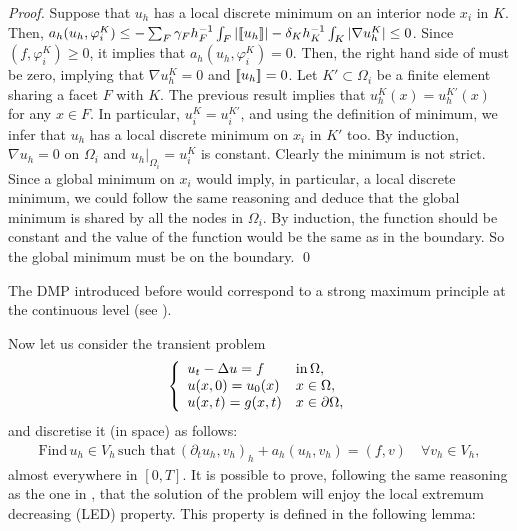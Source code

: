 \begin{proof}
Suppose that $u_h$ has a local discrete minimum on an interior node $x_i$ in $K$. Then, $a_h(u_h,\varphi_i^K) \leq -   \sum _{F}\gamma_F h_F^{-1} \int_F |\lbrack\!\lbrack u_h \rbrack\!\rbrack| - \delta_K h_K^{-1} \int_K |\nabla u^K_{h}| \leq 0$. Since $(f,\varphi_i^K) \geq 0$, it implies that $a_h(u_h,\varphi_i^K)=0$. { Then, the right hand side of  must be zero, implying that $\nabla u_h^{K}=0$ and $\lbrack\!\lbrack u_h \rbrack\!\rbrack=0$. Let $K'\subset \Omega_i$ be a finite element sharing a facet $F$ with $K$. The previous result implies that $u_h^K(x) = u_h^{K'}(x)$ for any $x\in F$. In particular, $u_i^K=u_i^{K'}$, and using the definition of minimum, 
we infer that $u_h$ has a local discrete minimum on $x_i$ in $K'$ too.
By induction, $\nabla u_h=0$ on $\Omega_i$ and $u_h|_{\Omega_i}=u_i^K$ is constant. Clearly the minimum is not strict. Since a global minimum on $x_i$ would imply, in particular, a local discrete minimum, we could follow the same reasoning and deduce that the global minimum is shared by all the nodes in $\Omega_i$. By induction, the function should be constant and the value of the function would be the same as in the boundary. So the global minimum must be on the boundary. \qed}%
\end{proof}

{
\begin{remark}
The DMP introduced before would correspond to a strong maximum principle at the continuous level (see \cite{gilbarg2001elliptic}).
\end{remark}}
Now let us consider the transient problem
\begin{equation}
\label{eq-strongform2}
\left\{
\begin{array}{ll}
\displaystyle u_t - \Delta u = f & \rm{in}\, \Omega, \\
u(x,0)= u_0(x) & x\in\Omega,\\
u(x,t)=g(x,t) & x\in \partial\Omega,\\
\end{array}\right.
\end{equation}
and discretise it (in space) as follows:
\begin{align}
\label{eq-weakform2}
\textrm{Find}\, u_h\in V_h \, \textrm{such that} \, (\partial_t u_h,v_h)_h + a_h(u_h,v_h) = (f,v) \quad \displaystyle\forall v_h\in V_h,
\end{align}
almost everywhere in $[0,T]$. It is possible to prove, following the same reasoning as the one in \cite{burman_nonlinear_2007}, that the solution of the problem will enjoy the local extremum decreasing (LED) property. This property is defined in the following lemma:

